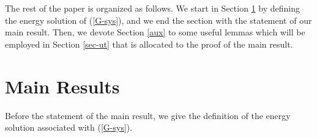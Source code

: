 \documentclass[12pt,leqno]{amsart}
\numberwithin{equation}{section}
\theoremstyle{remark}
\begin{document}
The  rest of the paper is organized as follows. We start in Section \ref{sec-main} by defining  the energy solution of (\ref{G-sys}), and  we end the section with the statement of our main result.  Then, we devote Section \ref{aux} to some useful lemmas which will be employed in Section \ref{sec-ut} that is allocated to the proof of the main result. 






\section{Main Results}\label{sec-main}
\par

Before the statement of the main result,  we give the definition of  the energy solution associated with (\ref{G-sys}).
\end{document}
